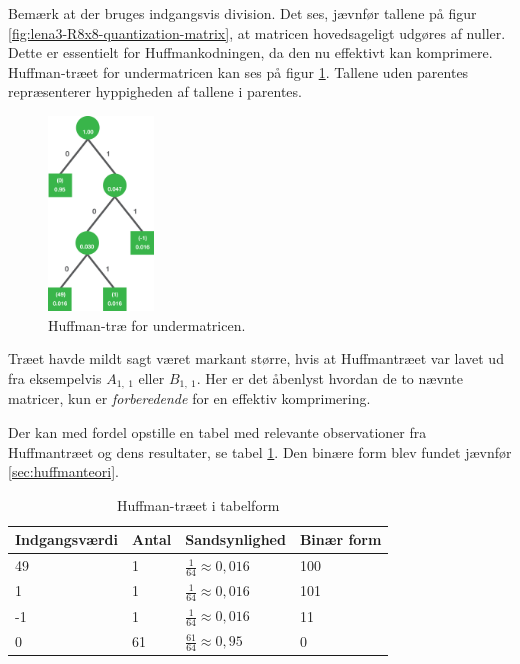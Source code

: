 Bemærk at der bruges indgangsvis division. Det ses, jævnfør tallene på figur \ref{fig:lena3-R8x8-quantization-matrix}, at matricen hovedsageligt udgøres af nuller. Dette er essentielt for Huffmankodningen, da den nu effektivt kan komprimere. Huffman-træet for undermatricen kan ses på figur \ref{fig:Huffman-8x8-visuel}. Tallene uden parentes repræsenterer hyppigheden af tallene i parentes.
\begin{figure}[htbp]
\centering
\includegraphics[width=0.25\textwidth]{Billeder/LenaAnvendelse/HUFFMAN/Huffman-8x8.png}
\caption{Huffman-træ for undermatricen.}
\label{fig:Huffman-8x8-visuel}
\end{figure}

Træet havde mildt sagt været markant større, hvis at Huffmantræet var lavet ud fra eksempelvis  $A_{1,\ 1}$ eller $B_{1,\ 1}$. Her er det åbenlyst hvordan de to nævnte matricer, kun er \textit{forberedende} for en effektiv komprimering.

Der kan med fordel opstille en tabel med relevante observationer fra Huffmantræet og dens resultater, se tabel \ref{tb:Huffman-8x8}. Den binære form blev fundet jævnfør \vref{sec:huffmanteori}.

\begin{table}[!h]
\centering
\begin{tabular}{|l|l|l|l|}
\hline
\textbf{Indgangsværdi} & \textbf{Antal} & \textbf{Sandsynlighed}      & \textbf{Binær form} \\ \hline
49                & 1              & $\frac{1}{64} \approx 0,016$ & 100                 \\ \hline
1                 & 1              & $\frac{1}{64} \approx 0,016$ & 101                 \\ \hline
-1                & 1              & $\frac{1}{64} \approx 0,016$ & 11                  \\ \hline
0                 & 61             & $\frac{61}{64} \approx 0,95$ & 0                   \\ \hline
\end{tabular}
\caption{Huffman-træet i tabelform}
\label{tb:Huffman-8x8}
\end{table}

